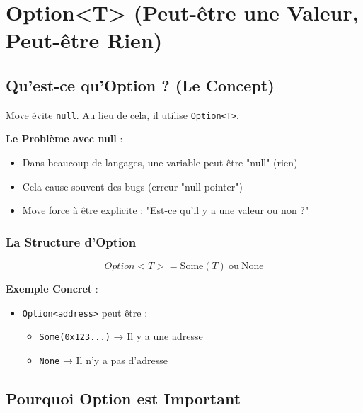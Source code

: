 \documentclass[11pt]{article}
\begin{document}
\section{Option<T> (Peut-être une Valeur, Peut-être Rien)}

\subsection{Qu'est-ce qu'Option ? (Le Concept)}

Move évite \texttt{null}. Au lieu de cela, il utilise \texttt{Option<T>}.

\begin{explainBox}
\textbf{Le Problème avec null} :
\begin{itemize}
  \item Dans beaucoup de langages, une variable peut être "null" (rien)
  \item Cela cause souvent des bugs (erreur "null pointer")
  \item Move force à être explicite : "Est-ce qu'il y a une valeur ou non ?"
\end{itemize}
\end{explainBox}

\subsubsection{La Structure d'Option}

\[
Option<T> = \text{Some}(T) \ \text{ou} \ \text{None}
\]

\begin{exampleBox}
\textbf{Exemple Concret} :
\begin{itemize}
  \item \texttt{Option<address>} peut être :
  \begin{itemize}
    \item \texttt{Some(0x123...)} → Il y a une adresse
    \item \texttt{None} → Il n'y a pas d'adresse
  \end{itemize}
\end{itemize}
\end{exampleBox}

\subsection{Pourquoi Option est Important}
\end{document}
